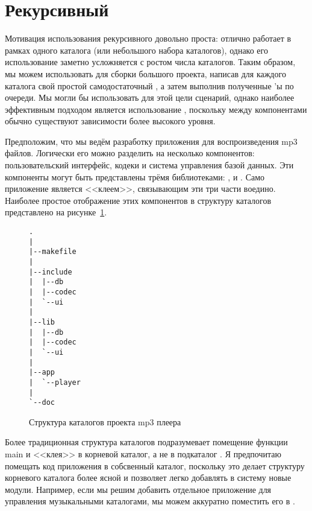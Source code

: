 \section{Рекурсивный \GNUmake{}}
\label{sec:recursive_make}

 Мотивация использования рекурсивного
\GNUmake{} довольно проста: \GNUmake{} отлично работает в рамках
одного каталога (или небольшого набора каталогов), однако его
использование заметно усложняется с ростом числа каталогов. Таким
образом, мы можем использовать \GNUmake{} для сборки большого проекта,
написав для каждого каталога свой простой самодостаточный \Makefile{},
а затем выполнив полученные \Makefile{}'ы по очереди. Мы могли бы
использовать для этой цели сценарий, однако наиболее эффективным
подходом является использование \GNUmake{}, поскольку между
компонентами обычно существуют зависимости более высокого уровня.

Предположим, что мы ведём разработку приложения для воспроизведения
mp3 файлов. Логически его можно разделить на несколько компонентов:
пользовательский интерфейс, кодеки и система управления базой
данных. Эти компоненты могут быть представлены трёмя библиотеками:
,  и . Само
приложение является <<клеем>>, связывающим эти три части
воедино. Наиболее простое отображение этих компонентов в структуру
каталогов представлено на рисунке~\ref{fig:file_layout_mp3}.

\begin{figure}
{\footnotesize
\begin{verbatim}
.
|
|--makefile
|
|--include
|  |--db
|  |--codec
|  `--ui
|
|--lib
|  |--db
|  |--codec
|  `--ui
|
|--app
|  `--player
|
`--doc
\end{verbatim}
}
\caption{Структура каталогов проекта mp3 плеера}
\label{fig:file_layout_mp3}
\end{figure}

Более традиционная структура каталогов подразумевает помещение функции
main и <<клея>> в корневой каталог, а не в подкаталог
. Я предпочитаю помещать код приложения в
собсвенный каталог, поскольку это делает структуру корневого каталога
более ясной и позволяет легко добавлять в систему новые
модули. Например, если мы решим добавить отдельное приложение для
управления музыкальными каталогами, мы можем аккуратно поместить его в
.

